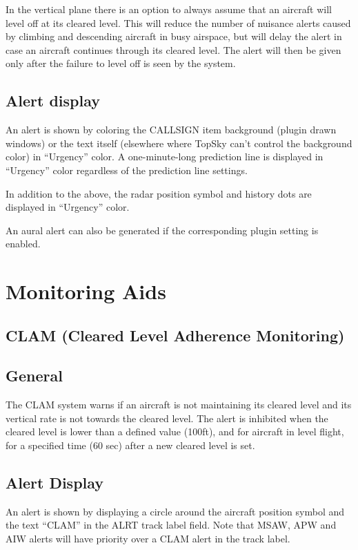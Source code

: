 \documentclass[11pt,a4paper,oldfontcommands]{memoir}
\begin{document}
In the vertical plane there is an option to always assume that an aircraft will level off at its cleared level. This will reduce the number of nuisance alerts caused by climbing and descending aircraft in busy airspace, but will delay the alert in case an aircraft continues through its cleared level. The alert will then be given only after the failure to level off is seen by the system.

\subsection*{Alert display}

An alert is shown by coloring the CALLSIGN item background (plugin drawn windows) or the text itself (elsewhere where TopSky can’t control the background color) in “Urgency” color. A one-minute-long prediction line is displayed in “Urgency” color regardless of the prediction line settings. 

In addition to the above, the radar position symbol and history dots are displayed in “Urgency” color.

An aural alert can also be generated if the corresponding plugin setting is enabled.

\section{Monitoring Aids}

\subsection{CLAM (Cleared Level Adherence Monitoring)}

\subsection*{General}

The CLAM system warns if an aircraft is not maintaining its cleared level and its vertical rate is not towards the cleared level. The alert is inhibited when the cleared level is lower than a defined value (100ft), and for aircraft in level flight, for a specified time (60 sec) after a new cleared level is set.

\subsection*{Alert Display}

An alert is shown by displaying a circle around the aircraft position symbol and the text “CLAM” in the ALRT track label field. Note that MSAW, APW and AIW alerts will have priority over a CLAM alert in the track label.
\end{document}
